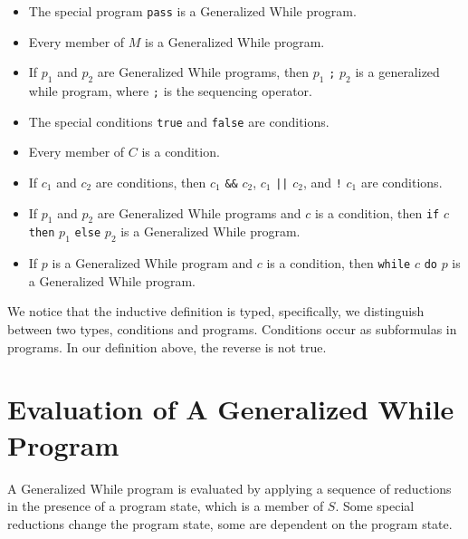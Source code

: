 \documentclass[11pt]{article}
\begin{document}
\begin{itemize}
\item The special program \texttt{pass} is a Generalized While program.
\item Every member of $M$ is a Generalized While program.
\item If $p_{1}$ and $p_{2}$ are Generalized While programs, then $p_{1}$ \texttt{;} $p_{2}$ is a generalized while program, where \texttt{;} is the sequencing operator.
\item The special conditions \texttt{true} and \texttt{false} are conditions.
\item Every member of $C$ is a condition.
\item If $c_{1}$ and $c_{2}$ are conditions, then $c_{1}$ \texttt{\&\&} $c_{2}$, $c_{1}$ \texttt{||} $c_{2}$, and \texttt{!} $c_{1}$ are conditions.
\item If $p_{1}$ and $p_{2}$ are Generalized While programs and $c$ is a condition, then \texttt{if} $c$ \texttt{then} $p_{1}$ \texttt{else} $p_{2}$ is a Generalized While program.
\item If $p$ is a Generalized While program and $c$ is a condition, then \texttt{while} $c$ \texttt{do} $p$ is a Generalized While program.
\end{itemize}

We notice that the inductive definition is typed, specifically, we distinguish between two types, conditions and programs.  Conditions occur as subformulas in programs.  In our definition above, the reverse is not true.

\section{Evaluation of A Generalized While Program}

A Generalized While program is evaluated by applying a sequence of reductions in the presence of a program state, which is a member of $S$.  Some special reductions change the program state, some are dependent on the program state.
\end{document}
